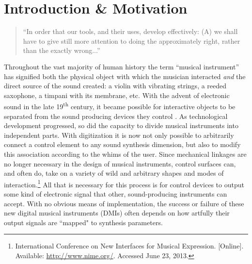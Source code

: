 
\chapter{Introduction \& Motivation}

\begin{quote}
``In order that our tools, and their uses, develop effectively: (A) we shall have to give still more attention to doing the approximately right, rather than the exactly wrong...'' \cite{tuckey}
\end{quote}

Throughout the vast majority of human history the term ``musical instrument'' has signified both the physical object with which the musician interacted \emph{and} the direct source of the sound created: a violin with vibrating strings, a reeded saxophone, a timpani with its membrane, etc. With the advent of electronic sound in the late 19\textsuperscript{th} century, it became possible for interactive objects to be separated from the sound producing devices they control \cite{chadabe}.
As technological development progressed, so did the capacity to divide musical instruments into independent parts. With digitization it is now not only possible to arbitrarily connect a control element to any sound synthesis dimension, but also to modify this association according to the whims of the user. Since mechanical linkages are no longer necessary in the design of musical instruments, control surfaces can, and often do, take on a variety of wild and arbitrary shapes and modes of interaction.\footnote{International Conference on New Interfaces for Musical Expression. [Online]. Available: \url{http://www.nime.org/}. Accessed June 23, 2013.}
All that is necessary for this process is for control devices to output some kind of electronic signal that other, sound-producing instruments can accept. With no obvious means of implementation, the success or failure of these new digital musical instruments (DMIs) often depends on how artfully their output signals are ``mapped" to synthesis parameters.

